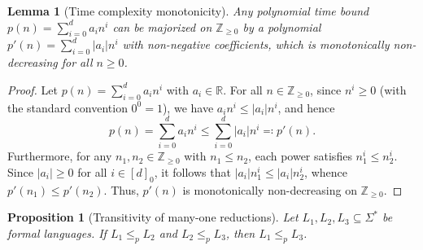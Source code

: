 \documentclass[11pt, letterpaper]{article}
\newtheorem{lemma}{Lemma}[section]
\newtheorem{proposition}{Proposition}[section]
\begin{document}
\begin{lemma}[Time complexity monotonicity]
\label{lem:poly_monotonicity}
Any polynomial time bound $p(n) = \sum_{i=0}^d a_i n^i$ can be majorized on $\mathbb{Z}_{\ge 0}$ by a polynomial $p'(n) = \sum_{i=0}^d |a_i| n^i$ with non-negative coefficients, which is monotonically non-decreasing for all $n \ge 0$.
\end{lemma}

\begin{proof}
Let $p(n) = \sum_{i=0}^d a_i n^i$ with $a_i \in \mathbb{R}$. For all $n \in \mathbb{Z}_{\ge 0}$, since $n^i \ge 0$ (with the standard convention $0^0 = 1$), we have $a_i n^i \le |a_i| n^i$, and hence
\begin{equation}
    p(n) = \sum_{i=0}^d a_i n^i \le \sum_{i=0}^d |a_i| n^i \eqqcolon p'(n).
\end{equation}
Furthermore, for any $n_1, n_2 \in \mathbb{Z}_{\ge 0}$ with $n_1 \le n_2$, each power satisfies $n_1^i \le n_2^i$. Since $|a_i| \ge 0$ for all $i \in [d]_0$, it follows that $|a_i| n_1^i \le |a_i| n_2^i$, whence $p'(n_1) \le p'(n_2)$. Thus, $p'(n)$ is monotonically non-decreasing on $\mathbb{Z}_{\ge 0}$.
\end{proof}

\begin{proposition}[Transitivity of many-one reductions]
Let $L_1, L_2, L_3 \subseteq \Sigma^*$ be formal languages. If $L_1 \le_p L_2$ and $L_2 \le_p L_3$, then $L_1 \le_p L_3$.
\end{proposition}
\end{document}
